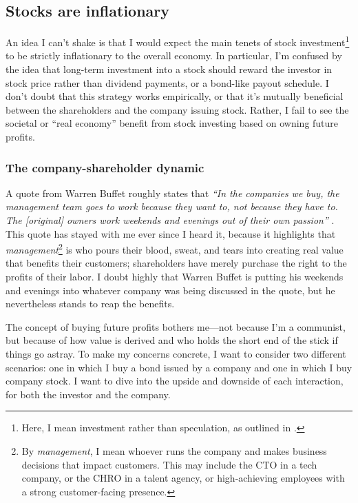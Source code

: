 \subsection{Stocks are inflationary}

An idea I can't shake is that I would expect the main tenets of stock investment\footnote{Here, I mean investment rather than speculation, as outlined in \cite{Graham2024}.} to be strictly inflationary to the overall economy.  In particular, I'm confused by the idea that long-term investment into a stock should reward the investor in stock price rather than dividend payments, or a bond-like payout schedule.  I don't doubt that this strategy works empirically, or that it's mutually beneficial between the shareholders and the company issuing stock.  Rather, I fail to see the societal or ``real economy'' benefit from stock investing based on owning future profits.

\subsubsection{The company-shareholder dynamic}

A quote from Warren Buffet roughly states that {\it ``In the companies we buy, the management team goes to work because they want to, not because they have to.  The [original] owners work weekends and evenings out of their own passion''} .  This quote has stayed with me ever since I heard it, because it highlights that {\it management}\footnote{By {\it management}, I mean whoever runs the company and makes business decisions that impact customers.  This may include the CTO in a tech company, or the CHRO in a talent agency, or high-achieving employees with a strong customer-facing presence.} is who pours their blood, sweat, and tears into creating real value that benefits their customers; shareholders have merely purchase the right to the profits of their labor.  I doubt highly that Warren Buffet is putting his weekends and evenings into whatever company was being discussed in the quote, but he nevertheless stands to reap the benefits.

The concept of buying future profits bothers me---not because I'm a communist, but because of how value is derived and who holds the short end of the stick if things go astray.  To make my concerns concrete, I want to consider two different scenarios: one in which I buy a bond issued by a company and one in which I buy company stock.  I want to dive into the upside and downside of each interaction, for both the investor and the company.  

